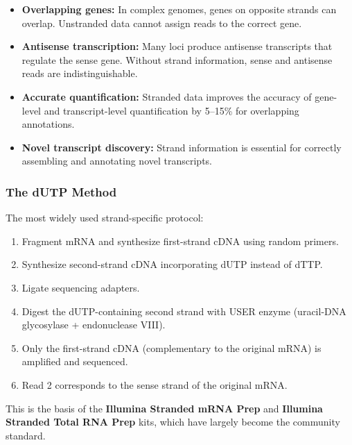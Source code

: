 \begin{itemize}[nosep]
  \item \textbf{Overlapping genes:} In complex genomes, genes on opposite
    strands can overlap. Unstranded data cannot assign reads to the correct
    gene.
  \item \textbf{Antisense transcription:} Many loci produce antisense
    transcripts that regulate the sense gene. Without strand information, sense
    and antisense reads are indistinguishable.
  \item \textbf{Accurate quantification:} Stranded data improves the accuracy
    of gene-level and transcript-level quantification by 5--15\% for
    overlapping annotations.
  \item \textbf{Novel transcript discovery:} Strand information is essential
    for correctly assembling and annotating novel transcripts.
\end{itemize}

\subsubsection{The dUTP Method}

The most widely used strand-specific protocol:

\begin{enumerate}[nosep]
  \item Fragment mRNA and synthesize first-strand cDNA using random primers.
  \item Synthesize second-strand cDNA incorporating dUTP instead of dTTP.
  \item Ligate sequencing adapters.
  \item Digest the dUTP-containing second strand with USER enzyme (uracil-DNA
    glycosylase + endonuclease VIII).
  \item Only the first-strand cDNA (complementary to the original mRNA) is
    amplified and sequenced.
  \item Read 2 corresponds to the sense strand of the original mRNA.
\end{enumerate}

This is the basis of the \textbf{Illumina Stranded mRNA Prep} and
\textbf{Illumina Stranded Total RNA Prep} kits, which have largely become the
community standard.

